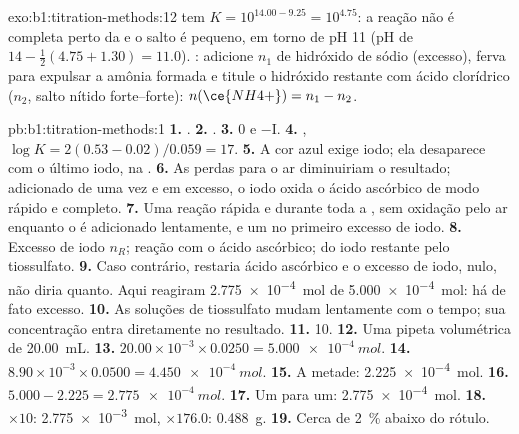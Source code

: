 \begin{solution}{exo:b1:titration-methods:12}
 tem $K = 10^{14.00 - 9.25} = 10^{4.75}$: a
reação não é completa perto da  e o salto é pequeno, em
torno de pH 11 (pH de  $14 - \frac12(4.75 + 1.30) = 11.0$).
: adicione $n_1$ de hidróxido de sódio (excesso),
ferva para expulsar a amônia formada e titule o hidróxido restante com
ácido clorídrico ($n_2$, salto nítido forte--forte): $n(\ce{NH4+}) = n_1 - n_2$.
\end{solution}

\begin{solution}{pb:b1:titration-methods:1}
\textbf{1.} .
\textbf{2.} .
\textbf{3.} 0 e $-$I.
\textbf{4.} , $\log K = 2(0.53 - 0.02)/0.059
= 17$.
\textbf{5.} A cor azul exige iodo; ela desaparece com o último iodo, na
.
\textbf{6.} As perdas para o ar diminuiriam o resultado; adicionado de
uma vez e em excesso, o iodo oxida o ácido ascórbico de modo rápido e
completo.
\textbf{7.} Uma reação rápida e  durante toda a ,
sem oxidação pelo ar enquanto o  é adicionado lentamente, e um
 no primeiro excesso de iodo.
\textbf{8.} Excesso de iodo $n_R$; reação com o ácido ascórbico;
 do iodo restante pelo tiossulfato.
\textbf{9.} Caso contrário, restaria ácido ascórbico e o excesso de iodo,
nulo, não diria quanto. Aqui reagiram
\qty{2.775e-4}{mol} de \qty{5.000e-4}{mol}: há de fato excesso.
\textbf{10.} As soluções de tiossulfato mudam lentamente com o tempo; sua
concentração entra diretamente no resultado.
\textbf{11.} 10.
\textbf{12.} Uma pipeta volumétrica de \qty{20.00}{mL}.
\textbf{13.} $20.00 \times 10^{-3} \times 0.0250 = \qty{5.000e-4}{mol}$.
\textbf{14.} $8.90 \times 10^{-3} \times 0.0500 = \qty{4.450e-4}{mol}$.
\textbf{15.} A metade: \qty{2.225e-4}{mol}.
\textbf{16.} $5.000 - 2.225 = \qty{2.775e-4}{mol}$.
\textbf{17.} Um para um: \qty{2.775e-4}{mol}.
\textbf{18.} $\times 10$: \qty{2.775e-3}{mol}, $\times 176.0$:
\qty{0.488}{g}.
\textbf{19.} Cerca de \qty{2}{\percent} abaixo do rótulo.

\end{solution}

